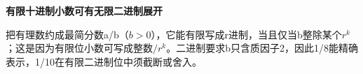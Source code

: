 {\color{ink}\bfseries 有限十进制小数可有无限二进制展开}\par\vspace{1bp}把有理数约成最简分数a/\allowbreak{}b（\(b>\allowbreak{}0\)），它能有限写成r进制，当且仅当b整除某个\(r^{k}\)；这是因为有限位小数可写成整数\(/\allowbreak{}r^{k}\)。二进制要求b只含质因子2，因此1/\allowbreak{}8能精确表示，1/\allowbreak{}10在有限二进制位中须截断或舍入。
